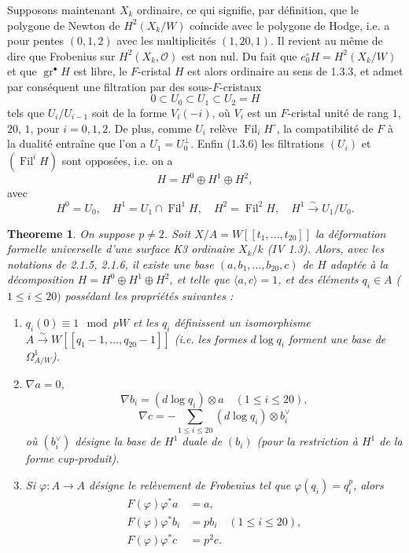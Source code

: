 \documentclass[12pt,a4paper]{article}
\theoremstyle{plain}
\newtheorem{theorem}{Theoreme}[section]
\theoremstyle{definition}
\theoremstyle{remark}
\DeclareMathOperator{\Fil}{Fil}
\DeclareMathOperator{\gr}{gr}
\begin{document}
\subsubsection{}
Supposons maintenant $X_k$ ordinaire, ce qui signifie, par d\'efinition, que le polygone de Newton de $H^2(X_k/W)$ co\'incide avec le polygone de Hodge, i.e. a pour pentes $(0, 1, 2)$ avec les multiplicit\'es $(1, 20, 1)$. Il revient au m\^eme de dire que Frobenius sur $H^2(X_k, \mathcal{O})$ est non nul. Du fait que $e^\circ_0 H = H^2(X_k/W)$ et que $\gr^\bullet H$ est libre, le $F$-cristal $H$ est alors ordinaire au sens de 1.3.3, et admet par cons\'equent une filtration par des sous-$F$-cristaux
\[
0 \subset U_0 \subset U_1 \subset U_2 = H
\]
tels que $U_i/U_{i-1}$ soit de la forme $V_i(-i)$, o\`u $V_i$ est un $F$-cristal unit\'e de rang $1$, $20$, $1$, pour $i = 0, 1, 2$. De plus, comme $U_i$ rel\`eve $\Fil_i H^\circ$, la compatibilit\'e de $F$ \`a la dualit\'e entra\^ine que l'on a $U_1 = U_0^\perp$. Enfin (1.3.6) les filtrations $(U_i)$ et $(\Fil^i H)$ sont oppos\'ees, i.e. on a
\[
H = H^0 \oplus H^1 \oplus H^2,
\]
avec
\[
H^0 = U_0, \quad H^1 = U_1 \cap \Fil^1 H, \quad H^2 = \Fil^2 H, \quad H^1 \xrightarrow{\sim} U_1/U_0.
\]

\begin{theorem}\label{thm:2.1.7}
On suppose $p \neq 2$. Soit $X/A = W[[t_1, \ldots, t_{20}]]$ la d\'eformation formelle universelle d'une surface K3 ordinaire $X_k/k$ (IV 1.3). Alors, avec les notations de 2.1.5, 2.1.6, il existe une base $(a, b_1, \ldots, b_{20}, c)$ de $H$ adapt\'ee \`a la d\'ecomposition $H = H^0 \oplus H^1 \oplus H^2$, et telle que $\langle a, c \rangle = 1$, et des \'el\'ements $q_i \in A$ ($1 \leqslant i \leqslant 20)$ poss\'edant les propri\'et\'es suivantes :
\begin{enumerate}[label=(\roman*)]
\item $q_i(0) \equiv 1 \mod pW$ et les $q_i$ d\'efinissent un isomorphisme $A \xrightarrow{\sim} W[[q_1 - 1, \ldots, q_{20} - 1]]$ (i.e. les formes $d\log q_i$ forment une base de $\Omega^1_{A/W}$).
\item $\nabla a = 0$,
\[
\nabla b_i = (d\log q_i) \otimes a \quad (1 \leqslant i \leqslant 20),
\]
\[
\nabla c = -\sum_{1\leqslant i\leqslant 20} (d\log q_i) \otimes b_i^\vee
\]
o\`u $(b_i^\vee)$ d\'esigne la base de $H^1$ duale de $(b_i)$ (pour la restriction \`a $H^1$ de la forme cup-produit).
\item Si $\varphi : A \to A$ d\'esigne le rel\`evement de Frobenius tel que $\varphi(q_i) = q_i^p$, alors
\begin{align*}
F(\varphi)\varphi^* a &= a, \\
F(\varphi)\varphi^* b_i &= pb_i \quad (1 \leqslant i \leqslant 20), \\
F(\varphi)\varphi^* c &= p^2 c.
\end{align*}
\end{enumerate}
\end{theorem}
\end{document}
